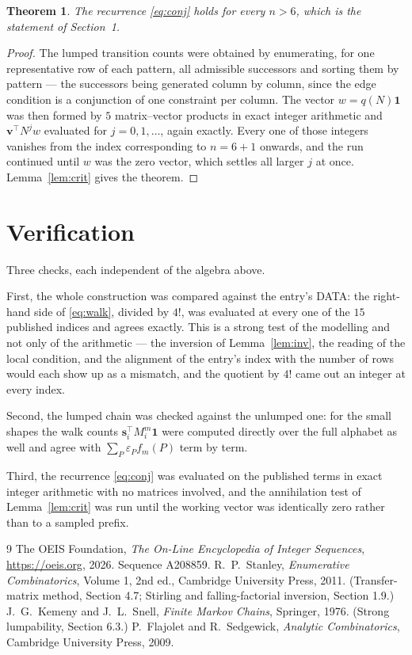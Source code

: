 \documentclass[11pt,a4paper]{article}
\theoremstyle{plain}
\newtheorem{theorem}{Theorem}
\theoremstyle{definition}
\begin{document}
\begin{theorem}
The recurrence \eqref{eq:conj} holds for every $n>6$, which is the statement of
Section~1.
\end{theorem}

\begin{proof}
The lumped transition counts were obtained by enumerating, for one representative row of
each pattern, all admissible successors and sorting them by pattern --- the successors being
generated column by column, since the edge condition is a conjunction of one constraint per
column. The vector $w=q(N)\mathbf{1}$ was then formed by $5$ matrix--vector products
in exact integer arithmetic and $\mathbf{v}^{\!\top}N^{j}w$ evaluated for
$j=0,1,\dots$, again exactly. Every one of those integers vanishes from the index
corresponding to $n=6+1$ onwards, and the run continued until $w$ was the zero vector,
which settles all larger $j$ at once. Lemma~\ref{lem:crit} gives the theorem.
\end{proof}

\section{Verification}

Three checks, each independent of the algebra above.

First, the whole construction was compared against the entry's DATA: the right-hand side of
\eqref{eq:walk}, divided by $4!$, was evaluated at every one of the $15$
published indices and agrees exactly. This is a strong test of the modelling and not only of
the arithmetic --- the inversion of Lemma~\ref{lem:inv}, the reading of the local
condition, and the alignment of the entry's index with the number of rows would each
show up as a mismatch, and the quotient by $4!$ came out an integer at every index.

Second, the lumped chain was checked against the unlumped one: for the small shapes the walk
counts $\mathbf{s}_i^{\!\top}M_i^{m}\mathbf{1}$ were computed directly over the full
alphabet as well and agree with $\sum_P\varepsilon_Pf_m(P)$ term by term.

Third, the recurrence \eqref{eq:conj} was evaluated on the published terms in exact integer
arithmetic with no matrices involved, and the annihilation test of Lemma~\ref{lem:crit} was
run until the working vector was identically zero rather than to a sampled prefix.

\begin{thebibliography}{9}
 The OEIS Foundation, \emph{The On-Line Encyclopedia of Integer
Sequences}, \url{https://oeis.org}, 2026. Sequence A208859.
 R.~P.~Stanley, \emph{Enumerative Combinatorics}, Volume 1, 2nd ed.,
Cambridge University Press, 2011. (Transfer-matrix method, Section 4.7; Stirling and
falling-factorial inversion, Section 1.9.)
 J.~G.~Kemeny and J.~L.~Snell, \emph{Finite Markov Chains}, Springer,
1976. (Strong lumpability, Section 6.3.)
 P.~Flajolet and R.~Sedgewick, \emph{Analytic Combinatorics}, Cambridge
University Press, 2009.
\end{thebibliography}
\end{document}
